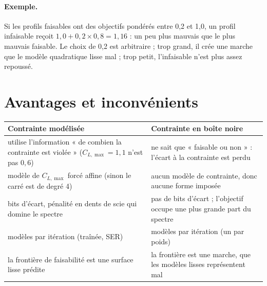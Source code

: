 \paragraph{Exemple.} Si les profils faisables ont des objectifs pondérés entre 0,2 et 1,0, un profil infaisable reçoit $1{,}0+0{,}2\times0{,}8=1{,}16$ : un peu plus mauvais que le plus mauvais faisable. Le choix de 0,2 est arbitraire ; trop grand, il crée une marche que le modèle quadratique lisse mal ; trop petit, l'infaisable n'est plus assez repoussé.

\section{Avantages et inconvénients}
\begin{center}
\renewcommand{\arraystretch}{1.25}
\small
\begin{tabularx}{\linewidth}{>{\raggedright\arraybackslash}X>{\raggedright\arraybackslash}X}
\toprule
Contrainte modélisée & Contrainte en boîte noire \\
\midrule
utilise l'information « de combien la contrainte est violée » ($C_{L,\max}=1{,}1$ n'est pas $0{,}6$) & ne sait que « faisable ou non » : l'écart à la contrainte est perdu \\
modèle de $C_{L,\max}$ forcé affine (sinon le carré est de degré 4) & aucun modèle de contrainte, donc aucune forme imposée \\
3 bits d'écart, pénalité en dents de scie qui domine le spectre & pas de bits d'écart ; l'objectif occupe une plus grande part du spectre \\
2 modèles par itération (traînée, SER) & 5 modèles par itération (un par poids) \\
la frontière de faisabilité est une surface lisse prédite & la frontière est une marche, que les modèles lisses représentent mal \\
\bottomrule
\end{tabularx}
\end{center}


